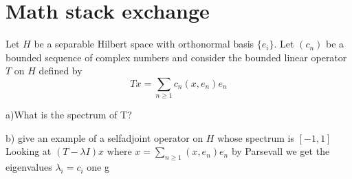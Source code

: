 \documentclass[titlepage]{article}
\begin{document}
\section{Math stack exchange}
Let $H$ be a separable Hilbert space with orthonormal basis $\{e_i\}$. Let $(c_n)$ be a bounded sequence of complex numbers and consider the bounded linear operator $T$ on $H$ defined by $$Tx = \sum_{n\geq 1} c_n(x,e_n)e_n$$

a)What is the spectrum of T?

b) give an example of a selfadjoint operator on $H$ whose spectrum is $[-1,1]$
Looking at $(T - \lambda I)x$ where  $x = \sum_{n\geq 1} (x,e_n)e_n$  by Parsevall we get the eigenvalues $\lambda_i = c_i$
one g
\end{document}
